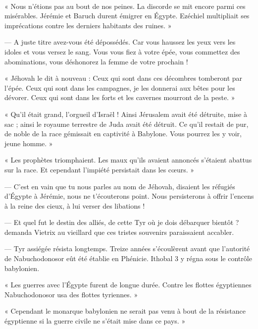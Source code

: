 \documentclass[a4paper, 11pt, oneside, polutonikogreek, french]{article}
\begin{document}
\paragraph{}
« Nous n'étions pas au bout de nos peines. La discorde se mit encore parmi ces misérables. Jérémie et Baruch durent émigrer en Égypte. Ezéchiel multipliait ses imprécations contre les derniers habitants des ruines. »

--- A juste titre avez-vous été dépossédés. Car vous haussez les yeux vers les idoles et vous versez le sang. Vous vous fiez à votre épée, vous commettez des abominations, vous déshonorez la femme de votre prochain !

« Jéhovah le dit à nouveau : Ceux qui sont dans ces décombres tomberont par l'épée. Ceux qui sont dans les campagnes, je les donnerai aux bêtes pour les dévorer. Ceux qui sont dans les forts et les cavernes mourront de la peste. »

« Qu'il était grand, l'orgueil d'Israël ! Ainsi Jérusalem avait été détruite, mise à sac ; ainsi le royaume terrestre de Juda avait été détruit. Ce qu'il restait de pur, de noble de la race gémissait en captivité à Babylone. Vous pourrez les y voir, jeune homme. »

« Les prophètes triomphaient. Les maux qu'ils avaient annoncés s'étaient abattus sur la race. Et cependant l'impiété persistait dans les cœurs. »

--- C'est en vain que tu nous parles au nom de Jéhovah, disaient les réfugiés d'Égypte à Jérémie, nous ne t'écouterons point. Nous persisterons à offrir l'encens à la reine des cieux, à lui verser des libations !

\bigskip
\centerline{\EightStarTaper}
\centerline{\EightStarTaper\EightStarTaper}
\bigskip

--- Et quel fut le destin des alliés, de cette Tyr où je dois débarquer bientôt ? demanda Vietrix au vieillard que ces tristes souvenirs paraissaient accabler.

--- Tyr assiégée résista longtemps. Treize années s'écoulèrent avant que l'autorité de Nabuchodonosor eût été établie en Phénicie. Ithobal 3 y régna sous le contrôle babylonien.

« Les guerres avec l'Égypte furent de longue durée. Contre les flottes égyptiennes Nabuchodonosor usa des flottes tyriennes. »

« Cependant le monarque babylonien ne serait pas venu à bout de la résistance égyptienne si la guerre civile ne s'était mise dans ce pays. »
\end{document}
